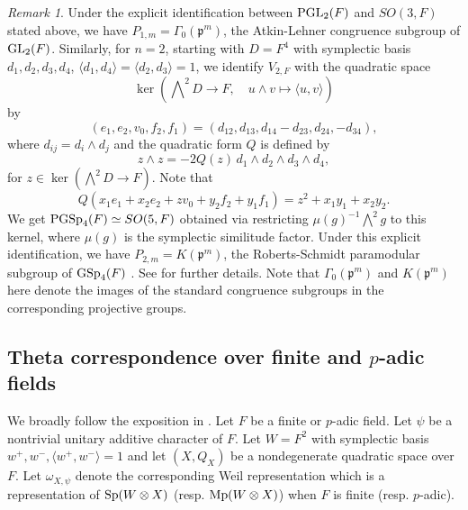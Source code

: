 \documentclass[12pt]{amsart}
\theoremstyle{definition}
\theoremstyle{remark}
\newtheorem{remark}{Remark}
\begin{document}
\begin{remark}
Under the explicit identification between ${\rm PGL}_2(F)$ and $SO(3,F)$ stated above, we have $P_{1,m} = \Gamma_0(\mathfrak p^m)$, the Atkin-Lehner congruence subgroup of ${\rm GL}_2(F)$.
Similarly, for $n=2$, starting with $D=F^4$ with symplectic basis $d_1,d_2,d_3,d_4$, 
$\langle d_1,d_4\rangle=\langle d_2,d_3\rangle=1$, we identify $V_{2,F}$ with the quadratic space 
\[
\ker \left(\bigwedge\nolimits^2D\longrightarrow F,\quad
u\wedge v\longmapsto\langle u,v\rangle\right)
\]
by
\[
(e_1,e_2,v_0,f_2,f_1)
=(d_{12},d_{13},d_{14}-d_{23},d_{24},-d_{34}),
\]
where $d_{ij}=d_i\wedge d_j$ and the quadratic form $Q$ is defined by
\[
z\wedge z=-2Q(z)\,d_1\wedge d_2\wedge d_3\wedge d_4,
\]
for $z \in \ker\!\left(\bigwedge\nolimits^2D\longrightarrow F\right)$. 
Note that
\[
Q(x_1e_1+x_2e_2+zv_0+y_2f_2+y_1f_1)
=z^2+x_1y_1+x_2y_2.
\]
We get ${\rm PGSp}_4(F) \simeq SO(5,F)$ obtained via 
restricting $\mu(g)^{-1}\bigwedge^2g$ to this kernel, where $\mu(g)$ is the symplectic similitude factor. Under this explicit identification, we have $P_{2,m}=K(\mathfrak p^m)$, the Roberts-Schmidt paramodular subgroup of ${\rm GSp}_4(F)$ \cite[p. 6]{rs07}. See \cite[Chapter 6]{tsa13} for further details. Note that $\Gamma_0(\mathfrak p^m)$ and $K(\mathfrak p^m)$ here denote the images of the standard congruence subgroups in the corresponding projective groups.
\end{remark}

\subsection{Theta correspondence over finite and $p$-adic fields}\label{theta-finite}

We broadly follow the exposition in \cite{kud96,pra98}. Let $F$ be a finite or $p$-adic field. Let $\psi$ be a nontrivial unitary additive character of $F$. Let $W=F^2$ with symplectic basis $w^+, w^-, \langle w^+, w^- \rangle =1$ and let $(X,Q_X)$ be a nondegenerate quadratic space over $F$. Let $\omega_{X,\psi}$ denote the corresponding Weil representation which is a representation of ${\rm Sp}(W \otimes X)$ (resp. ${\rm Mp}(W\otimes X)$) when $F$ is finite (resp. $p$-adic). 
 
\end{document}
